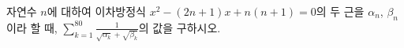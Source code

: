 자연수 $n$에 대하여 이차방정식 $x^2-(2n+1)x+n(n+1)=0$의 두 근을 $\alpha_n$, $\beta_n$이라 할 때, $\displaystyle\sum_{k=1}^{80}\frac{1}{\sqrt{\alpha_k}+\sqrt{\beta_k}}$의 값을 구하시오.
